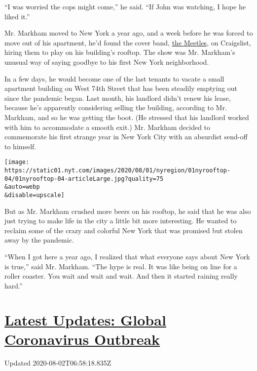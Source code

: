 ``I was worried the cops might come,'' he said. ``If John was watching,
I hope he liked it.''

Mr. Markham moved to New York a year ago, and a week before he was
forced to move out of his apartment, he'd found the cover band,
\href{http://www.meetles.com/}{the Meetles}, on Craigslist, hiring them
to play on his building's rooftop. The show was Mr. Markham's unusual
way of saying goodbye to his first New York neighborhood.

In a few days, he would become one of the last tenants to vacate a small
apartment building on West 74th Street that has been steadily emptying
out since the pandemic began. Last month, his landlord didn't renew his
lease, because he's apparently considering selling the building,
according to Mr. Markham, and so he was getting the boot. (He stressed
that his landlord worked with him to accommodate a smooth exit.) Mr.
Markham decided to commemorate his first strange year in New York City
with an absurdist send-off to himself.

\texttt{[image: https://static01.nyt.com/images/2020/08/01/nyregion/01nyrooftop-04/01nyrooftop-04-articleLarge.jpg?quality=75\\\&auto=webp\\\&disable=upscale]}

But as Mr. Markham crushed more beers on his rooftop, he said that he
was also just trying to make life in the city a little bit more
interesting. He wanted to reclaim some of the crazy and colorful New
York that was promised but stolen away by the pandemic.

``When I got here a year ago, I realized that what everyone says about
New York is true,'' said Mr. Markham. ``The hype is real. It was like
being on line for a roller coaster. You wait and wait and wait. And then
it started raining really hard.''

\hypertarget{latest-updates-global-coronavirus-outbreak}{%
\section{\texorpdfstring{\href{https://www.nytimes.com/2020/08/01/world/coronavirus-covid-19.html?action=click\&pgtype=Article\&state=default\&region=MAIN_CONTENT_1\&context=storylines_live_updates}{Latest
Updates: Global Coronavirus
Outbreak}}{Latest Updates: Global Coronavirus Outbreak}}\label{latest-updates-global-coronavirus-outbreak}}

Updated 2020-08-02T06:58:18.835Z

